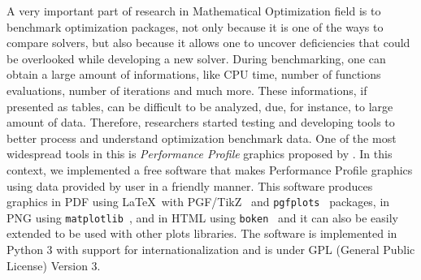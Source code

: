 A very important part of research in Mathematical Optimization field is to benchmark
optimization packages, not only because it is one of the ways to compare
solvers, but also because it allows one to uncover deficiencies that could
be overlooked while developing a new solver. During benchmarking, one can
obtain a large amount of  informations, like CPU time, number of functions
evaluations, number of iterations and much more. These informations, if
presented as tables, can be difficult to be analyzed, due, for instance, to
large amount of data.  Therefore, researchers started testing and developing
tools to better process and understand optimization benchmark data. One of
the most widespread tools in this is \emph{Performance Profile} graphics proposed by
\textcite{Dolan:2002du}. In this context, we implemented a free software
that makes Performance Profile graphics using data provided by user in a
friendly manner. This software produces graphics in PDF using \LaTeX\ with
PGF/TikZ~\cite{TikZ} and \texttt{pgfplots}~\cite{pgfplots} packages, in
PNG using \texttt{matplotlib}~\cite{Hunter:2007}, and in HTML using
\texttt{boken}~\cite{url:bokeh} and it can also be easily
extended to be used with other plots libraries. The software is implemented
in Python 3 with support for internationalization and is under GPL (General
Public License) Version 3.
